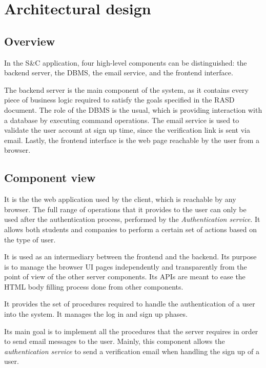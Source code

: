\chapter{Architectural design}

\section{Overview}

In the S\&C application, four high-level components can be distinguished: the backend server, the DBMS, the email service, and the frontend interface.

The backend server is the main component of the system, as it contains every piece of business logic required to satisfy the goals specified in the RASD document.
The role of the DBMS is the usual, which is providing interaction with a database by executing command operations.
The email service is used to validate the user account at sign up time, since the verification link is sent via email.  
Lastly, the frontend interface is the web page reachable by the user from a browser.

\section{Component view}

It is the the web application used by the client, which is reachable by any browser.
The full range of operations that it provides to the user can only be used after the authentication process, performed by the \textit{Authentication service}.
It allows both students and companies to perform a certain set of actions based on the type of user.

It is used as an intermediary between the frontend and the backend.
Its purpose is to manage the browser UI pages independently and transparently from the point of view of the other server components.
Its APIs are meant to ease the HTML body filling process done from other components.

It provides the set of procedures required to handle the authentication of a user into the system.
It manages the log in and sign up phases.

Its main goal is to implement all the procedures that the server requires in order to send email messages to the user.
Mainly, this component allows the \textit{authentication service} to send a verification email when handling the sign up of a user.  

